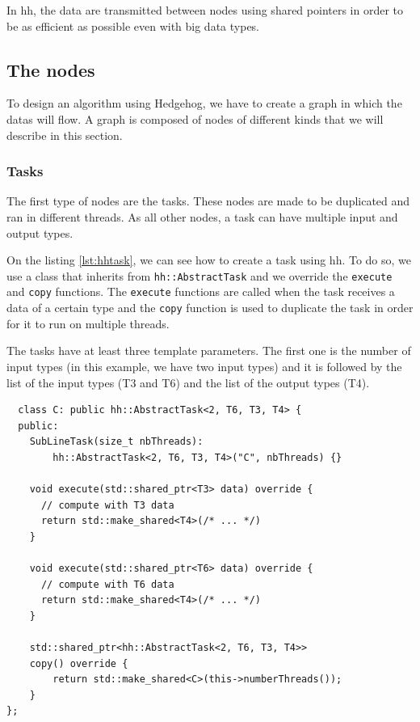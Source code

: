 In \gls{hh}, the data are transmitted between nodes using shared pointers in
order to be as efficient as possible even with big data types. %

\subsection{The nodes}

To design an algorithm using Hedgehog, we have to create a graph in which the
datas will flow. A graph is composed of nodes of different kinds that we will
describe in this section.

\subsubsection{Tasks}

The first type of nodes are the tasks. These nodes are made to be duplicated and
ran in different threads. As all other nodes, a task can have multiple input and
output types.

On the listing \ref{lst:hhtask}, we can see how to create a task using \gls{hh}.
To do so, we use a class that inherits from \texttt{hh::AbstractTask} and we
override the \texttt{execute} and \texttt{copy} functions. The
\texttt{execute} functions are called when the task receives a data of a certain
type and the \texttt{copy} function is used to duplicate the task in order for
it to run on multiple threads.

The tasks have at least three template parameters. The first one is the number
of input types (in this example, we have two input types) and it is followed by
the list of the input types (T3 and T6) and the list of the output types (T4).

\begin{listing}[ht!]
\begin{verbatim}
  class C: public hh::AbstractTask<2, T6, T3, T4> {
  public:
    SubLineTask(size_t nbThreads):
        hh::AbstractTask<2, T6, T3, T4>("C", nbThreads) {}

    void execute(std::shared_ptr<T3> data) override {
      // compute with T3 data
      return std::make_shared<T4>(/* ... */)
    }

    void execute(std::shared_ptr<T6> data) override {
      // compute with T6 data
      return std::make_shared<T4>(/* ... */)
    }

    std::shared_ptr<hh::AbstractTask<2, T6, T3, T4>>
    copy() override {
        return std::make_shared<C>(this->numberThreads());
    }
};
\end{verbatim}
\label{lst:hhtask}
\end{listing}

